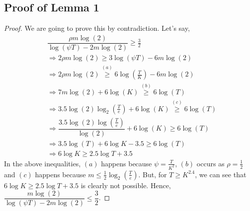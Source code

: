 \subsection{Proof of Lemma 1}
\label{sec:proofTheorem:Lemma1}
\begin{proof}
We are going to prove this by contradiction. Let's say,
\begin{align*}
 & \dfrac{\rho m \log(2)}{\log(\psi T) - 2m\log( 2)} \geq \frac{3}{2} \\
 &\Rightarrow 2\rho m \log(2) \geq 3\log(\psi T) - 6m\log( 2) \\
 &\Rightarrow 2\rho m \log(2) \overset{(a)}{\geq} 6\log(\frac{T}{K}) - 6m\log( 2) \\
 &\Rightarrow 7 m \log(2) + 6\log(K) \overset{(b)}{\geq} 6\log(T) \\
 &\Rightarrow 3.5 \log(2) \log_2(\frac{T}{e}) + 6\log(K) \overset{(c)}{\geq} 6\log(T) \\
 &\Rightarrow \dfrac{3.5 \log (2) \log (\frac{T}{e})}{\log(2)} + 6\log(K) \geq 6\log(T)\\
 &\Rightarrow 3.5 \log(T) + 6\log K - 3.5 \geq 6\log (T)\\
 &\Rightarrow 6\log K \geq 2.5 \log T + 3.5 
\end{align*}
In the above inequalities, $(a)$ happens because $\psi=\frac{T}{K^2}$, $(b)$ occurs as $\rho=\frac{1}{2}$ and $(c)$ happens because $m\leq \frac{1}{2} \log_2(\frac{T}{e})$. But, for $T\geq K^{2.4}$, we can see that $6\log K \geq 2.5 \log T + 3.5$ is clearly not possible. Hence, $\dfrac{m \log(2)}{\log(\psi T) - 2m\log( 2)} \leq \dfrac{3}{2}$.
\end{proof}


